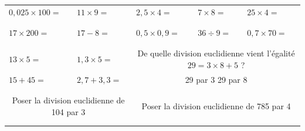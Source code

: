 \documentclass[14]{article}
\begin{document}
    \begin{tabular}{p{3cm}|p{3cm}|p{3cm}|p{3cm}|p{3cm}}
         $0,025\times100=$ & $11\times9=$ & $2,5\times 4 = $ & $7\times8=$ & $25\times4=$\\ 
         
         & & & &\\ \hline & & & &\\
         
         $17\times 200=$ & $17-8=$ & $0,5\times0,9=$ &  $36\div9=$ & $0,7\times70=$\\
         
         & & & &\\ \hline & & \multicolumn{3}{c}{}\\

        $13\times5=$ & $1,3\times5=$ & 
        \multicolumn{3}{c}{De quelle division euclidienne vient l'égalité $29=3\times8+5$ ?}\\[2ex]

        $15+45=$ & $2,7+3,3=$ & \multicolumn{3}{c}{29 par 3 \hspace{2cm} 29 par 8}\\

        & & \multicolumn{3}{c}{}\\ \hline \multicolumn{2}{c|}{} & \multicolumn{2}{c}{}\\
         
         \multicolumn{2}{c|}{Poser la division euclidienne de 104 par 3} & 
         \multicolumn{3}{c}{Poser la division euclidienne de 785 par 4}\\[2ex]
         
         \multicolumn{2}{c|}{} & 
         \multicolumn{3}{c}{}\\[10ex]

        \multicolumn{2}{c|}{} & \multicolumn{2}{c}{} \\
    \end{tabular}
\end{document}
